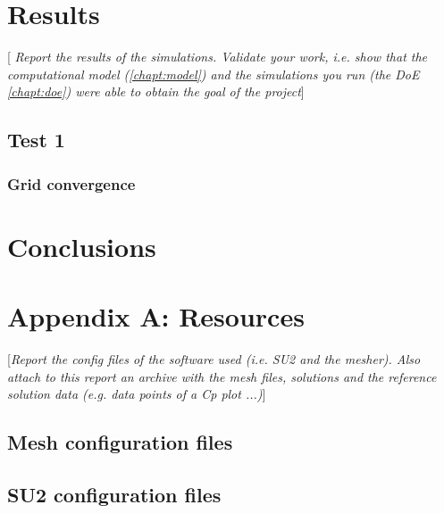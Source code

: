 \documentclass[10pt,english, openany]{book}
\begin{document}
\chapter{Results}\label{chapt:results}
[\textit{ Report the results of the simulations. Validate your work, i.e. show that the computational model (\ref{chapt:model}) and the simulations you run (the DoE \ref{chapt:doe}) were able to obtain the goal of the project}]
\section{Test 1}
\subsection{Grid convergence}

\chapter{Conclusions}

\pagebreak





\pagebreak

\chapter*{Appendix A: Resources}
[\textit{Report the config files of the software used (i.e. SU2 \cite{economon2015su2} and the mesher). Also attach to this report an archive with the mesh files, solutions and the reference solution data (e.g. data points of a Cp plot ...)}]
\section*{Mesh configuration files}
\section*{SU2 configuration files}
\end{document}

